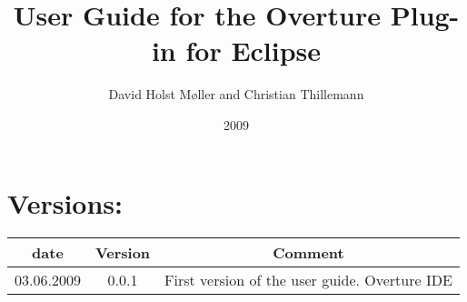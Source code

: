 \documentclass[11pt,a4paper,english,makeidx]{report}
\title{User Guide for the Overture Plug-in for Eclipse}
\author{David Holst M\o ller and Christian Thillemann}
\date{2009}
\makeatletter
\def\maketitle{%
  \null
  \thispagestyle{empty}%
  \vfill
  \begin{center}\leavevmode
    \normalfont
    {\LARGE \@title\par}%
    \vskip 1cm
    {\Large \@author\par}%
    \vskip 1cm
    {\Large \@date\par}%
  \end{center}%
  \vfill
  \null
  \cleardoublepage
  }
\makeatother
\begin{document}
\maketitle


\section*{Versions:}



\begin{tabular}{|c|c|c|}
\hline 
date & Version & Comment\tabularnewline
\hline
\hline 
03.06.2009 & 0.0.1 & First version of the user guide. Overture
IDE\tabularnewline
\hline
\end{tabular}

\newtheorem{fig}{Figure}\newtheorem{tab}{Table}

\setcounter{page}{1} \setcounter{chapter}{0} \setcounter{secnumdepth}{4}
\setcounter{tocdepth}{3}

\pagestyle{myheadings}


\pagestyle{headings}
\tableofcontents

\pagebreak


\end{document}

